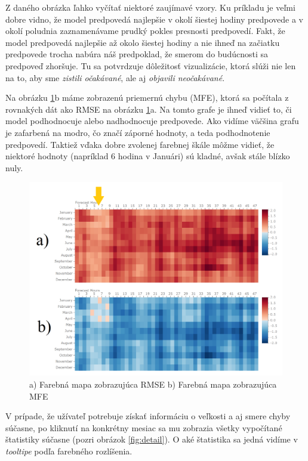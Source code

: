 Z daného obrázka ľahko vyčítať niektoré zaujímavé vzory. Ku príkladu je veľmi dobre vidno, že model predpovedá najlepšie v okolí šiestej hodiny predpovede a v okolí poludnia zaznamenávame prudký pokles presnosti predpovedí. Fakt, že model predpovedá najlepšie až okolo šiestej hodiny a nie ihneď na začiatku predpovede trocha nabúra náš predpoklad, že smerom do budúcnosti sa predpoveď zhoršuje. Tu sa potvrdzuje dôležitosť vizualizácie, ktorá slúži nie len na to, aby sme \textit{zistili očakávané}, ale aj \textit{objavili neočakávané}.

Na obrázku \ref{fig:overview}b máme zobrazenú priemernú chybu (MFE), ktorá sa počítala z rovnakých dát ako RMSE na obrázku \ref{fig:overview}a. Na tomto grafe je ihneď vidieť to, či model podhodnocuje alebo nadhodnocuje predpovede. Ako vidíme väčšina grafu je zafarbená na modro, čo značí záporné hodnoty, a teda podhodnotenie predpovedí. Taktiež vďaka dobre zvolenej farebnej škále môžme vidieť, že niektoré hodnoty (napríklad 6 hodina v Januári) sú kladné, avšak stále blízko nuly.

\begin{figure}
	\centering
	\includegraphics[width = 5in]{overview}
	\caption{a) Farebná mapa zobrazujúca RMSE b) Farebná mapa zobrazujúca MFE}
	\label{fig:overview} 
\end{figure}

V prípade, že užívateľ potrebuje získať informáciu o veľkosti a aj smere chyby súčasne, po kliknutí na konkrétny mesiac sa mu zobrazia všetky vypočítané štatistiky súčasne (pozri obrázok \ref{fig:detail}). O aké štatistika sa jedná vidíme v \textit{tooltipe} podľa farebného rozlíšenia.

